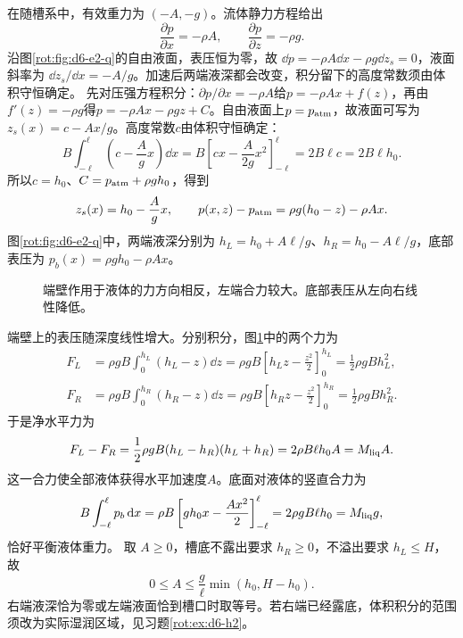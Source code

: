 \begin{solution}
在随槽系中，有效重力为 $(-A,-g)$。流体静力方程给出
\[
\frac{\partial p}{\partial x}=-\rho A,\qquad
\frac{\partial p}{\partial z}=-\rho g.
\]
沿图\ref{rot:fig:d6-e2-q}的自由液面，表压恒为零，故 $\dd p=-\rho A\dd x-\rho g\dd z_s=0$，液面斜率为 $\dd z_s/\dd x=-A/g$。加速后两端液深都会改变，积分留下的高度常数须由体积守恒确定。
先对压强方程积分：$\partial p/\partial x=-\rho A$给$p=-\rho Ax+f(z)$，再由$f'(z)=-\rho g$得$p=-\rho Ax-\rho gz+C$。自由液面上$p=p_{\rm atm}$，故液面可写为$z_s(x)=c-Ax/g$。高度常数$c$由体积守恒确定：
\[
B\int_{-\ell}^{\ell}\left(c-\frac Agx\right)\dd x
=B\left[cx-\frac{A}{2g}x^2\right]_{-\ell}^{\ell}
=2B\ell c=2B\ell h_0.
\]
所以$c=h_0$、$C=p_{\rm atm}+\rho gh_0$，得到
\[
z_s(x)=h_0-\frac Agx,\qquad
p(x,z)-p_{\rm atm}=\rho g(h_0-z)-\rho Ax.
\]
图\ref{rot:fig:d6-e2-q}中，两端液深分别为
$h_L=h_0+A\ell/g$、$h_R=h_0-A\ell/g$，底部表压为 $p_b(x)=\rho gh_0-\rho Ax$。
\begin{figure}[H]\centering
{}
\caption{端壁作用于液体的力方向相反，左端合力较大。底部表压从左向右线性降低。}\label{rot:fig:d6-e2-s}
\end{figure}
端壁上的表压随深度线性增大。分别积分，图\ref{rot:fig:d6-e2-s}中的两个力为
\[
\begin{aligned}
F_L&=\rho gB\int_0^{h_L}(h_L-z)\dd z
=\rho gB\left[h_Lz-\frac{z^2}{2}\right]_0^{h_L}
=\frac12\rho gBh_L^2,\\
F_R&=\rho gB\int_0^{h_R}(h_R-z)\dd z
=\rho gB\left[h_Rz-\frac{z^2}{2}\right]_0^{h_R}
=\frac12\rho gBh_R^2.
\end{aligned}
\]
于是净水平力为
\[
F_L-F_R=\frac12\rho gB(h_L-h_R)(h_L+h_R)
=2\rho B\ell h_0A=M_{\rm liq}A.
\]
这一合力使全部液体获得水平加速度$A$。底面对液体的竖直合力为
\[
B\int_{-\ell}^{\ell}p_b\mathop{}\!\mathrm d x
=\rho B\left[gh_0x-\frac{Ax^2}{2}\right]_{-\ell}^{\ell}
=2\rho gB\ell h_0=M_{\rm liq}g,
\]
恰好平衡液体重力。
取 $A\ge0$，槽底不露出要求 $h_R\ge0$，不溢出要求 $h_L\le H$，故
\[
0\le A\le\frac g\ell\min(h_0,H-h_0).
\]
右端液深恰为零或左端液面恰到槽口时取等号。若右端已经露底，体积积分的范围须改为实际湿润区域，见习题\ref{rot:ex:d6-h2}。
\end{solution}



